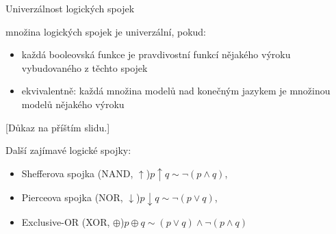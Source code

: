 \documentclass{beamer}
\begin{document}
\begin{frame}{Univerzálnost logických spojek}

    množina logických spojek je \alert{univerzální}, pokud:
    \begin{itemize}        
        \item každá booleovská funkce je pravdivostní funkcí nějakého výroku vybudovaného z těchto spojek
        \item ekvivalentně: každá množina modelů nad konečným jazykem je množinou modelů nějakého výroku
    \end{itemize}

    
    {\footnotesize [Důkaz na příštím slidu.]}


    Další zajímavé logické spojky:
    \begin{itemize}
        \item \alert{Shefferova spojka} (NAND, $\uparrow$)\hfill $p\uparrow q \sim \neg (p\land q)$,
        \item \alert{Pierceova spojka} (NOR, $\downarrow$)\hfill $p\downarrow q \sim \neg (p\lor q)$,
        \item \alert{Exclusive-OR} (XOR, $\oplus$)\hfill $p\oplus q \sim (p\lor q)\land\neg(p\land q)$
    \end{itemize}

\end{frame}
\end{document}
